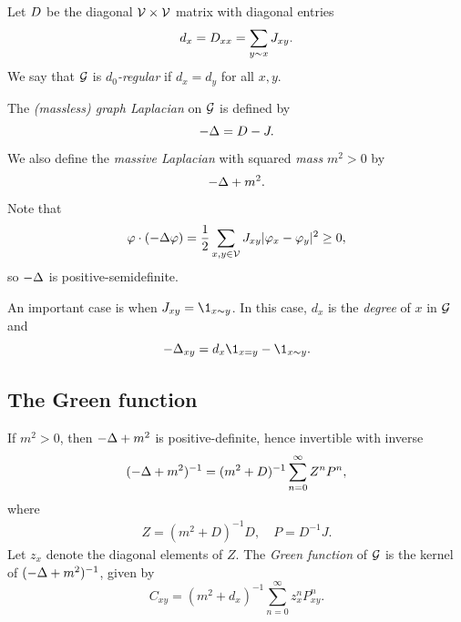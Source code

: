 Let $D$ be the diagonal $\mathcal{V}\times\mathcal{V}$ matrix with diagonal entries
\begin{equation}
d_x = D_{xx} = \sum_{y \sim x} J_{xy}.
\end{equation}
We say that $\mathcal{G}$ is \emph{$d_0$-regular} if $d_x = d_y$ for all $x, y$.

The \emph{(massless) graph Laplacian} on $\mathcal{G}$ is defined by
\begin{equation}
-\Delta = D - J.
\end{equation}
We also define the \emph{massive Laplacian} with squared \emph{mass} $m^2 > 0$
by
\begin{equation}
-\Delta + m^2.
\end{equation}
Note that
\begin{equation}
\varphi \cdot (-\Delta \varphi)
  =
\frac{1}{2} \sum_{x,y\in\mathcal{V}} J_{xy} |\varphi_x - \varphi_y|^2
  \ge
0,
\end{equation}
so $-\Delta$ is positive-semidefinite.

\begin{example}
An important case is when $\jay_{xy} = \1_{x\sim y}$.
In this case, $d_x$ is the \emph{degree} of $x$ in $\mathcal{G}$ and
\begin{equation}
\label{e:Deltaxy}
-\Delta_{xy} = d_x \1_{x=y} - \1_{x \sim y}.
\end{equation}
\end{example}


\subsection{The Green function}

If $m^2 > 0$, then $-\Delta + m^2$ is positive-definite, hence invertible with inverse
\begin{equation}
(-\Delta + m^2)^{-1} = (m^2 + D)^{-1} \sum_{n=0}^\infty Z^n P^n,
\end{equation}
where
\begin{align}
Z = (m^2 + D)^{-1} D,
  \quad
P = D^{-1} J.
\end{align}
Let $z_x$ denote the diagonal elements of $Z$. The \emph{Green function}
of $\mathcal{G}$ is the kernel of $(-\Delta + m^2)^{-1}$, given by
\begin{equation}
\label{e:greendef}
C_{xy}
  =
(m^2 + d_x)^{-1} \sum_{n=0}^\infty z_x^n P^n_{xy}.
\end{equation}

